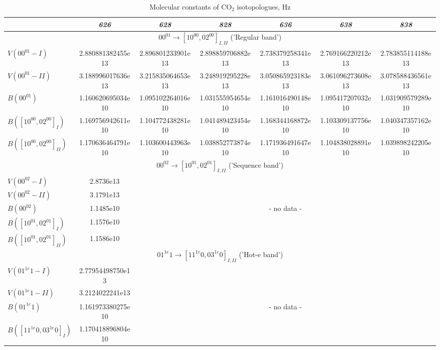 \documentclass{report}
\begin{document}
\begin{appendices}
\begin{table}
\centering
\caption{Molecular constants of CO$_2$ isotopologues, Hz}
\label{table:VB}
\footnotesize
\begin{tabular}{|l|cccccc|}
\hline
& \textit{626} & \textit{628} & \textit{828} & \textit{636} & \textit{638} & \textit{838}\\
\hline
\multicolumn{7}{|c|}{$00^01\rightarrow[10^00,02^00]_{I,II}$ ('Regular band')}\\
\hline
$V(00^01-I)$            & 2.880881382455e13 & 2.896801233901e13 & 2.898859706882e13 & 2.738379258341e13 & 2.769166220212e13 & 2.783855114188e13\\
$V(00^01-II)$           & 3.188996017636e13 & 3.215835064653e13 & 3.248919295228e13 & 3.050865923183e13 & 3.061096273608e13 & 3.078588436561e13\\
$B(00^01)$              & 1.160620695034e10 & 1.095102264016e10 & 1.031555954654e10 & 1.161016490148e10 & 1.095417207032e10 & 1.031909579289e10\\
$B([10^00,02^00]_I)$    & 1.169756942611e10 & 1.104772438281e10 & 1.041489423454e10 & 1.168344168872e10 & 1.103309137756e10 & 1.040347357162e10\\
$B([10^00,02^00]_{II})$ & 1.170636464791e10 & 1.103600443963e10 & 1.038852773874e10 & 1.171936491647e10 & 1.104838028891e10 & 1.039898242205e10\\
\hline
\multicolumn{7}{|c|}{$00^02\rightarrow[10^01,02^01]_{I,II}$ ('Sequence band')}\\
\hline
$V(00^02-I)$            & 2.8736e13 &  &  &  &  &\\
$V(00^02-II)$           & 3.1791e13 &  &  &  &  &\\
$B(00^02)$              & 1.1485e10 & \multicolumn{5}{c|}{- no data -}\\
$B([10^01,02^01]_I)$    & 1.1576e10 &  &  &  &  &\\
$B([10^01,02^01]_{II})$ & 1.1586e10 &  &  &  &  &\\
\hline
\multicolumn{7}{|c|}{$01^{1e}1\rightarrow[11^{1e}0,03^{1e}0]_{I,II}$ ('Hot-e band')}\\
\hline
$V(01^{1e}1-I)$               & 2.77954498750e13  &  &  &  &  &\\
$V(01^{1e}1-II)$              & 3.2124022241e13   &  &  &  &  &\\
$B(01^{1e}1)$                 & 1.161973380275e10 & \multicolumn{5}{c|}{- no data -}\\
$B([11^{1e}0,03^{1e}0]_I)$    & 1.170418896804e10 &  &  &  &  &\\

\end{tabular}
\end{table}
\end{appendices}
\end{document}
